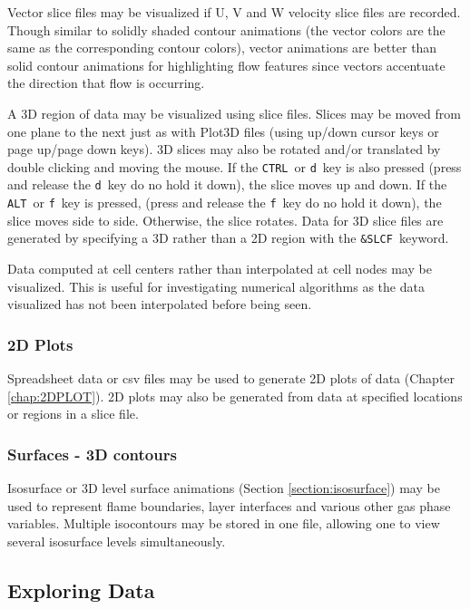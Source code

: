 \documentclass[11pt,twoside]{book}
\begin{document}
Vector slice files may be visualized if U, V and W velocity slice files are recorded.
Though
similar to solidly shaded contour animations (the vector colors are
the same as the corresponding contour colors), vector animations are better
than solid contour animations for highlighting flow
features since vectors accentuate the direction that flow is occurring.

A 3D region of
data may be visualized using slice files.  Slices may be moved from one plane to
the next just as with Plot3D files (using up/down cursor keys or
page up/page down keys).
3D slices may also be rotated and/or translated by double clicking and
moving the mouse. If the {\tt CTRL}\ or {\tt d}\ key
is also pressed
(press and release the {\tt d}\ key do no hold it down),
the slice moves up and down.
If the {\tt ALT}\ or {\tt f}\ key is pressed,
(press and release the {\tt f}\ key do no hold it down),
the slice moves side to side.
Otherwise, the slice rotates.
Data for 3D slice files are generated by specifying a 3D rather than a
2D region with the {\tt \&SLCF}\ keyword.

Data computed at cell centers rather than interpolated at cell nodes may be visualized.
This is useful for investigating numerical algorithms as the data visualized
has not been interpolated before being seen.

\subsubsection{2D Plots}
Spreadsheet data or csv files may be used to generate 2D plots of data (Chapter \ref{chap:2DPLOT}).  2D plots may
also be generated from data at specified locations or regions in a slice file.

\subsubsection{Surfaces - 3D contours}
Isosurface or 3D level surface animations (Section
\ref{section:isosurface}) may be used to represent flame
boundaries, layer interfaces and various other gas phase
variables. Multiple isocontours may be stored in one file,
allowing one to view several isosurface levels simultaneously.


\subsection{Exploring Data}
\end{document}
